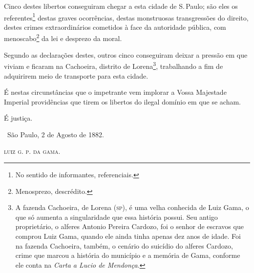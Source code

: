 Cinco destes libertos conseguiram chegar a esta cidade de S.\,Paulo; são
eles os referentes\footnote{No sentido de informantes, referenciais.}
destas graves ocorrências, destas monstruosas transgressões do direito,
destes crimes extraordinários cometidos à face da autoridade pública,
com menoscabo\footnote{Menosprezo, descrédito.} da lei e desprezo da
moral.

Segundo as declarações destes, outros cinco conseguiram deixar a pressão
em que viviam e ficaram na Cachoeira, distrito de Lorena\footnote{A
  fazenda Cachoeira, de Lorena (\textsc{sp}), é uma velha conhecida de Luiz Gama,
  o que só aumenta a singularidade que essa história possui. Seu antigo
  proprietário, o alferes Antonio Pereira Cardozo, foi o senhor de
  escravos que comprou Luiz Gama, quando ele ainda tinha apenas dez anos
  de idade. Foi na fazenda Cachoeira, também, o cenário do suicídio do
  alferes Cardozo, crime que marcou a história do município e a memória
  de Gama, conforme ele conta na \emph{Carta a Lucio de Mendonça}.},
trabalhando a fim de
adquirirem meio de transporte para esta cidade.

É nestas circunstâncias que o impetrante vem implorar a Vossa Majestade
Imperial providências que tirem os libertos do ilegal domínio em que se
acham.

É justiça.

\bigskip

\hfill\ São Paulo, 2 de Agosto de 1882.

\hfill\textsc{luiz g. p. da gama.}

\asterisc
